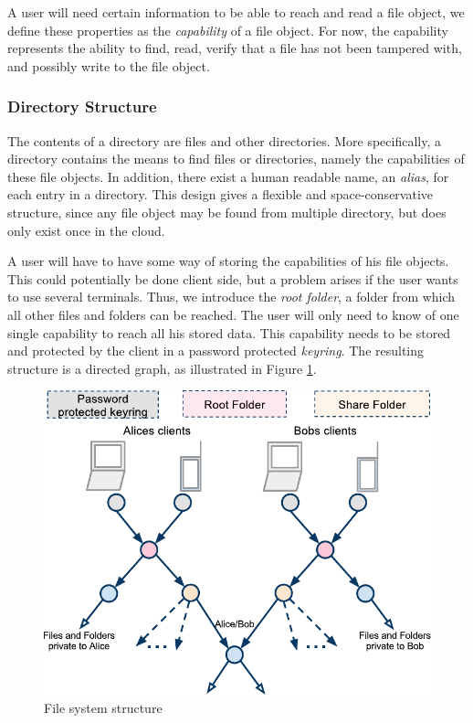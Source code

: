 \documentclass[pdftex,english,10pt,b5paper,twoside]{book}
\begin{document}
A user will need certain information to be able to reach and read a file
object, we define these properties as the \emph{capability} of a file object.
For now, the capability represents the ability to find, read, verify that a
file has not been tampered with, and possibly write to the file object.

\subsubsection{Directory Structure}

The contents of a directory are files and other directories. More specifically,
a directory contains the means to find files or directories, namely the
capabilities of these file objects. In addition, there exist a human readable
name, an \emph{alias}, for each entry in a directory. This design gives a
flexible and space-conservative structure, since any file object may be found
from multiple directory, but does only exist once in the cloud.

A user will have to have some way of storing the capabilities of his file
objects. This could potentially be done client side, but a problem arises if
the user wants to use several terminals. Thus, we introduce the \emph{root
folder}, a folder from which all other files and folders can be reached. The
user will only need to know of one single capability to reach all his stored
data. This capability needs to be stored and protected by the client in a
password protected \emph{keyring}. The resulting structure is a
directed graph, as illustrated in Figure \ref{fig:AS:filesystem}.

\begin{figure}[h!]
    \centering
    \includegraphics[width=\columnwidth]{ArchitectureFileSystem.pdf}
    \caption{File system structure}
    \label{fig:AS:filesystem}
\end{figure}
\end{document}
